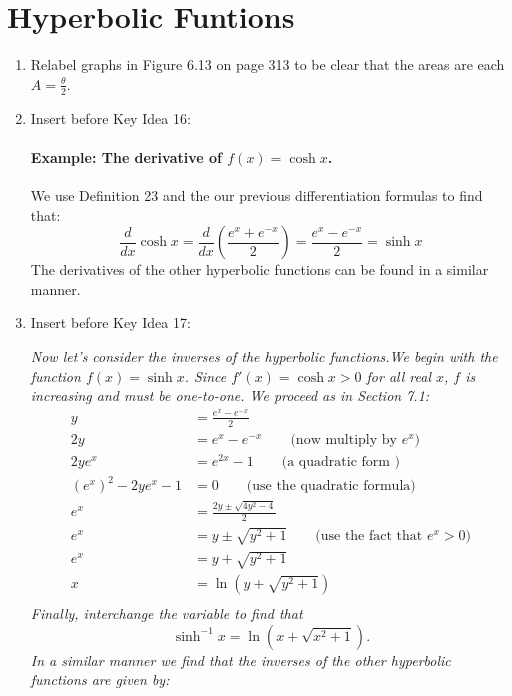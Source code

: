 
\section{Hyperbolic Funtions}

\begin{enumerate}
\item Relabel graphs in Figure 6.13 on page 313 to be clear that the areas are each $A=\frac\theta2$.

\item Insert before Key Idea 16:

{\slshape \paragraph{Example: The derivative of $f(x)=\cosh x$.} We use Definition 23 and the our previous differentiation formulas to find that:
\[\frac d{dx}\cosh x=\frac d{dx}\left( \frac{e^x+e^{-x}}2\right)=\frac{e^x-e^{-x}}2=\sinh x\]
The derivatives of the other hyperbolic functions can be found in a similar manner.
}
\item Insert before Key Idea 17: 

{\slshape Now let's consider the inverses of the hyperbolic functions.We begin with the function $f(x)=\sinh x$. Since $f'(x)=\cosh x>0$ for all real $x$, $f$ is increasing and must be one-to-one. We proceed as in Section 7.1:
\begin{equation*}
\begin{split}
y&=\frac{e^x-e^{-x}}2\\
2y&=e^x-e^{-x} \qquad\text{(now multiply by $e^x$)}\\
2ye^x&=e^{2x}-1 \qquad\text{(a quadratic form )}\\
\left(e^x\right)^2-2ye^x-1&=0 \qquad\text{(use the quadratic formula)}\\
e^x&=\frac{2y\pm\sqrt{4y^2-4}}2\\
e^x&=y\pm\sqrt{y^2+1} \qquad\text{(use the fact that $e^x>0$)}\\
e^x&=y+\sqrt{y^2+1}\\
x&=\ln(y+\sqrt{y^2+1})\\
\end{split}
\end{equation*}
Finally, interchange the variable to find that \[\sinh^{-1} x=\ln(x+\sqrt{x^2+1}).\] In a similar manner we find that the inverses of the other hyperbolic functions are given by:}
\end{enumerate}